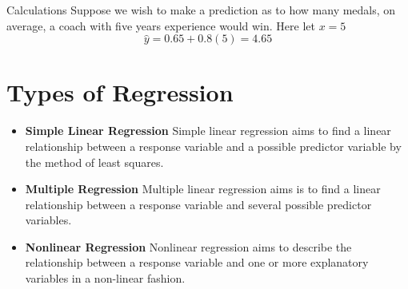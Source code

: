 \documentclass[]{report}
\begin{document}
{Calculations}
Suppose we wish to make a prediction as to how many medals, on average, a coach with five years experience would win. 
Here let $x=5$
\[ \hat{y} = 0.65 + 0.8(5) = 4.65\]

\section{Types of Regression}

\begin{itemize}
	\item \textbf{Simple Linear Regression}
	Simple linear regression aims to find a linear relationship between a response variable and a possible predictor variable by the method of least squares.
	
	
	
	\item \textbf{Multiple Regression}
	Multiple linear regression aims is to find a linear relationship between a response variable and several possible predictor variables.
	
	
	
	\item \textbf{Nonlinear Regression}
	Nonlinear regression aims to describe the relationship between a response variable and one or more explanatory variables in a non-linear fashion.
\end{itemize}




					
\end{document}

